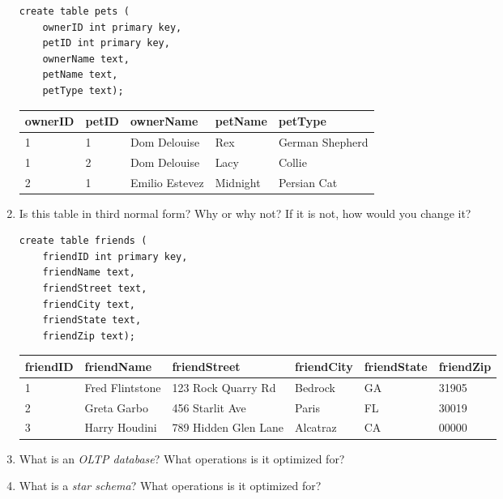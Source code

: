 \documentclass{article}
\begin{document}
\begin{enumerate}
            \begin{verbatim}
create table pets (
    ownerID int primary key,
    petID int primary key,
    ownerName text,
    petName text,
    petType text);
            \end{verbatim}

            \begin{tabular}{| l | l | l | l | l |}
\hline
\textbf{ownerID} & \textbf{petID} & \textbf{ownerName}  & \textbf{petName} & \textbf{petType} \\
\hline
1 & 1 & Dom Delouise & Rex & German Shepherd \\
\hline
1 & 2 & Dom Delouise & Lacy & Collie \\
\hline
2 & 1 & Emilio Estevez & Midnight & Persian Cat \\
\hline
            \end{tabular}

        \item Is this table in third normal form? Why or why not? If it is not, how would you change it?

            \begin{verbatim}
create table friends (
    friendID int primary key,
    friendName text,
    friendStreet text,
    friendCity text,
    friendState text,
    friendZip text);
            \end{verbatim}

            \begin{tabular}{| l | l | l | l | l | l |}
\hline
\textbf{friendID} & \textbf{friendName} & \textbf{friendStreet}  & \textbf{friendCity} & \textbf{friendState} & \textbf{friendZip} \\
\hline
1 & Fred Flintstone & 123 Rock Quarry Rd & Bedrock & GA & 31905 \\  
\hline
2 & Greta Garbo & 456 Starlit Ave & Paris & FL & 30019 \\  
\hline
3 & Harry Houdini & 789 Hidden Glen Lane & Alcatraz & CA & 00000 \\  
\hline
            \end{tabular}

        \item What is an \textit{OLTP database}? What operations is it optimized for?


        \item What is a \textit{star schema}? What operations is it optimized for?


    \end{enumerate}
\end{document}
